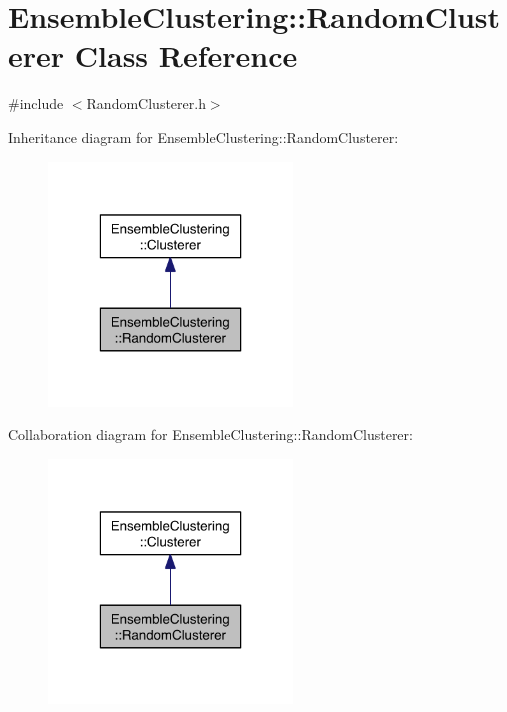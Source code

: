 \hypertarget{class_ensemble_clustering_1_1_random_clusterer}{\section{Ensemble\-Clustering\-:\-:Random\-Clusterer Class Reference}
\label{class_ensemble_clustering_1_1_random_clusterer}
}


{\ttfamily \#include $<$Random\-Clusterer.\-h$>$}



Inheritance diagram for Ensemble\-Clustering\-:\-:Random\-Clusterer\-:
\nopagebreak
\begin{figure}[H]
\begin{center}
\leavevmode
\includegraphics[width=184pt]{class_ensemble_clustering_1_1_random_clusterer__inherit__graph}
\end{center}
\end{figure}


Collaboration diagram for Ensemble\-Clustering\-:\-:Random\-Clusterer\-:
\nopagebreak
\begin{figure}[H]
\begin{center}
\leavevmode
\includegraphics[width=184pt]{class_ensemble_clustering_1_1_random_clusterer__coll__graph}
\end{center}
\end{figure}
